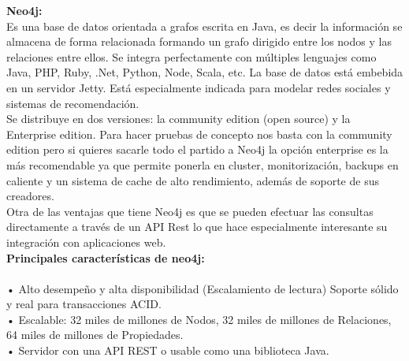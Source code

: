 \documentclass[twoside,onecolumn]{article}
\begin{document}
\begin{flushright}
\begin{itemize}
\textbf{Neo4j:}\\
 Es una base de datos orientada a grafos escrita en Java, es decir la información se almacena de forma relacionada formando un grafo dirigido entre los nodos y las relaciones entre ellos. Se integra perfectamente con múltiples lenguajes como Java, PHP, Ruby, .Net,  Python, Node, Scala, etc. La base de datos está embebida en un servidor Jetty. Está especialmente indicada para modelar redes sociales y sistemas de recomendación.\textbf{}\\
Se distribuye en dos versiones: la community edition (open source) y la Enterprise edition. Para hacer pruebas de concepto nos basta con la community edition pero si quieres sacarle todo el partido a Neo4j la opción enterprise es la más recomendable ya que permite ponerla en cluster, monitorización, backups en caliente y un sistema de cache de alto rendimiento, además de soporte de sus creadores.\textbf{}\\
Otra de las ventajas que tiene Neo4j es que se pueden efectuar las consultas directamente a través de un API Rest lo que hace especialmente interesante su integración con aplicaciones web.
\textbf{}\\
\textbf{Principales características de neo4j:}\\
\textbf{}\\
•	Alto desempeño y alta disponibilidad (Escalamiento de lectura) Soporte sólido y real para transacciones ACID.
\textbf{}\\
•	Escalable: 32 miles de millones de Nodos, 32 miles de millones de Relaciones, 64 miles de millones de Propiedades.
\textbf{}\\
•	Servidor con una API REST o usable como una biblioteca Java.


\textbf{}\\
\textbf{}\\
\textbf{}\\
\textbf{}\\
\textbf{}\\
\textbf{}\\
\textbf{}\\
\textbf{}\\
\textbf{}\\
\textbf{}\\
\textbf{}\\
\textbf{}\\
\textbf{}\\
\textbf{}\\
\textbf{}\\
\textbf{}\\
\textbf{}\\
\textbf{}\\


\end{itemize}
\end{flushright}
\end{document}
